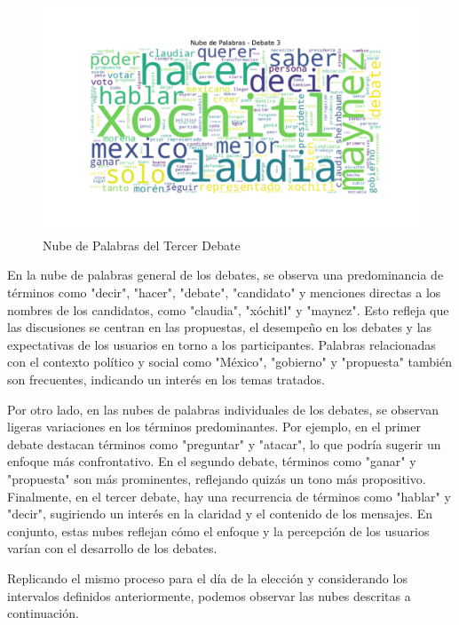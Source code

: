 \documentclass[10pt, a4paper]{article}
\begin{document}
	
	\newpage
	\vspace{-10mm}
	\begin{figure}[h!]
		\centering
		\includegraphics[width=1\textwidth]{nube_palabras_debate_3.pdf} %
		\vspace{-22mm}
		\caption{Nube de Palabras del Tercer Debate}
		\label{fig:nubeDebate3} %
	\end{figure}
	
	En la nube de palabras general de los debates, se observa una predominancia de términos como "decir", "hacer", "debate", "candidato" y menciones directas a los nombres de los candidatos, como "claudia", "xóchitl" y "maynez". Esto refleja que las discusiones se centran en las propuestas, el desempeño en los debates y las expectativas de los usuarios en torno a los participantes. Palabras relacionadas con el contexto político y social como "México", "gobierno" y "propuesta" también son frecuentes, indicando un interés en los temas tratados.
	
	Por otro lado, en las nubes de palabras individuales de los debates, se observan ligeras variaciones en los términos predominantes. Por ejemplo, en el primer debate destacan términos como "preguntar" y "atacar", lo que podría sugerir un enfoque más confrontativo. En el segundo debate, términos como "ganar" y "propuesta" son más prominentes, reflejando quizás un tono más propositivo. Finalmente, en el tercer debate, hay una recurrencia de términos como "hablar" y "decir", sugiriendo un interés en la claridad y el contenido de los mensajes. En conjunto, estas nubes reflejan cómo el enfoque y la percepción de los usuarios varían con el desarrollo de los debates.
	
	Replicando el mismo proceso para el día de la elección y considerando los intervalos definidos anteriormente, podemos observar las nubes descritas a continuación.
	
\end{document}
